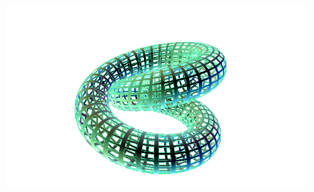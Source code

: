 \documentclass[14pt]{article}
\begin{document}
\begin{figure}[htp]
\centering
\includegraphics[width=10.0m]{10.jpg}
\label{fig:lion}
\end{figure}
\end{document}
